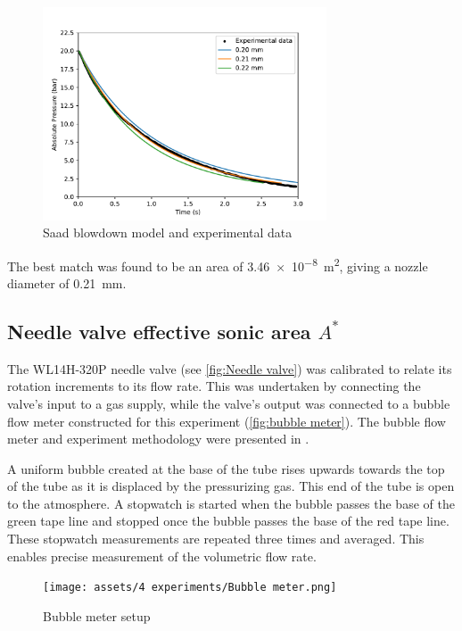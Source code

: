             \begin{figure}[!ht]
                \centering
                \includegraphics[width=0.75\textwidth]{assets/4 experiments/Saad blowdown fit.pdf}
                \caption{Saad blowdown model and experimental data}
                \label{fig:saad blowdown}
            \end{figure}

            The best match was found to be an area of \qty{3.46e-8}{m^2}, giving a nozzle diameter of \qty{0.21}{mm}.

        \subsection{Needle valve effective sonic area $A^*$}

            The WL14H-320P needle valve (see \autoref{fig:Needle valve}) was calibrated to relate its rotation increments to its flow rate. This was undertaken by connecting the valve's input to a gas supply, while the valve's output was connected to a bubble flow meter constructed for this experiment (\autoref{fig:bubble meter}). The bubble flow meter and experiment methodology were presented in \textcite{barigouFluidMechanicsSoap1993}.

            A uniform bubble created at the base of the tube rises upwards towards the top of the tube as it is displaced by the pressurizing gas. This end of the tube is open to the atmosphere. A stopwatch is started when the bubble passes the base of the green tape line and stopped once the bubble passes the base of the red tape line. These stopwatch measurements are repeated three times and averaged. This enables precise measurement of the volumetric flow rate.

            \begin{figure}[!ht]
                \centering
                \texttt{[image: assets/4 experiments/Bubble meter.png]}
                \caption{Bubble meter setup}
                \label{fig:bubble meter}
            \end{figure}

